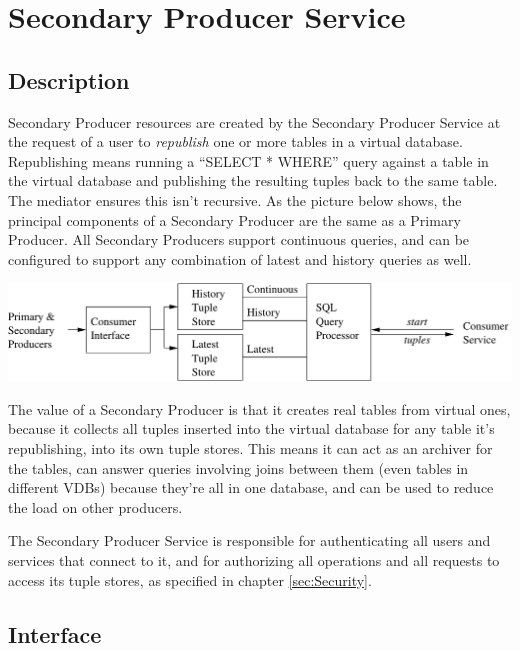 \section{Secondary Producer Service}\label{sec:SecondaryProducer}

\subsection{Description}

Secondary Producer resources are created by the Secondary Producer
Service at the request of a user to
\textit{republish} one or more tables in a virtual
database. Republishing means running a ``SELECT * WHERE'' query
against a table in the virtual database and publishing the resulting
tuples back to the same table. The mediator ensures this isn't
recursive. As the picture below shows, the principal components of a
Secondary Producer are the same as a Primary Producer. All Secondary
Producers support continuous queries, and can be configured to support
any combination of latest and history queries as well.

\begin{center}
\includegraphics[width=160mm]{sp_detail}
\end{center}

The value of a Secondary Producer is that it creates real tables from
virtual ones, because it collects all tuples inserted into the virtual database
for any table it's republishing, into its own tuple stores. This means it can
act as an archiver for the tables, can answer queries involving joins between
them (even tables in different VDBs) because they're all in one database,
and can be used to reduce the load on other producers.

The Secondary Producer Service is responsible for authenticating all
users and services that connect to it, and for authorizing all
operations and all requests to access its tuple stores, as specified
in chapter \ref{sec:Security}.

\subsection{Interface}

